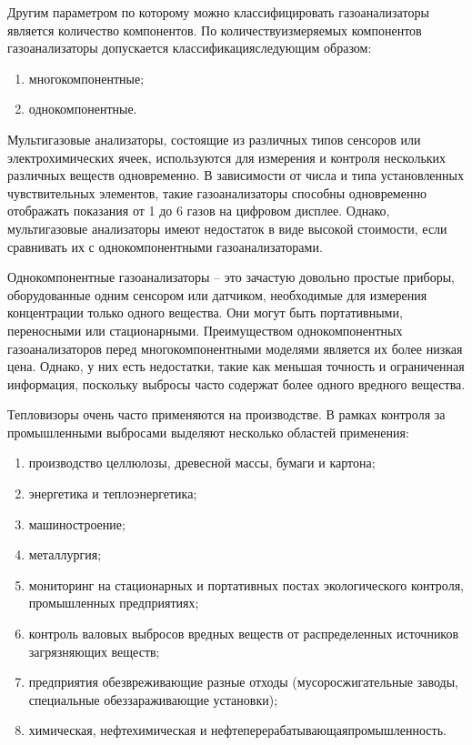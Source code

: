 \documentclass[14pt, a4paper]{extreport}
\begin{document}
	Другим параметром по которому можно классифицировать газоанализаторы является количество компонентов. По количеству\linebreak измеряемых компонентов газоанализаторы допускается классификация\linebreak следующим образом:
	\begin{enumerate}[label={\arabic*)}]
		\item многокомпонентные;
		\item однокомпонентные.
	\end{enumerate}
	
	Мультигазовые анализаторы, состоящие из различных типов сенсоров или электрохимических ячеек, используются для измерения и контроля нескольких различных веществ одновременно. В зависимости от числа и типа установленных чувствительных элементов, такие газоанализаторы способны одновременно отображать показания от 1 до 6 газов на цифровом дисплее. Однако, мультигазовые анализаторы имеют недостаток в виде высокой стоимости, если сравнивать их с однокомпонентными газоанализаторами.
	
	Однокомпонентные газоанализаторы -- это зачастую довольно простые приборы, оборудованные одним сенсором или датчиком, необходимые для измерения концентрации только одного вещества. Они могут быть портативными, переносными или стационарными. Преимуществом однокомпонентных газоанализаторов перед многокомпонентными моделями является их более низкая цена. Однако, у них есть недостатки, такие как меньшая точность и ограниченная информация, поскольку выбросы часто содержат более одного вредного вещества.
	
	Тепловизоры очень часто применяются на производстве. В рамках контроля за промышленными выбросами выделяют несколько областей применения:
	\begin{enumerate}[label={\arabic*)}]
		\item производство целлюлозы, древесной массы, бумаги и картона;
		\item энергетика и теплоэнергетика;
		\item машиностроение;
		\item металлургия;
		\item мониторинг на стационарных и портативных постах экологического контроля, промышленных предприятиях;
		\item контроль валовых выбросов вредных веществ от распределенных источников загрязняющих веществ;
		\item предприятия обезвреживающие разные отходы (мусоросжигательные заводы, специальные обеззараживающие установки);
		\item химическая, нефтехимическая и нефтеперерабатывающая\linebreak промышленность.
	\end{enumerate}
	
\end{document}
